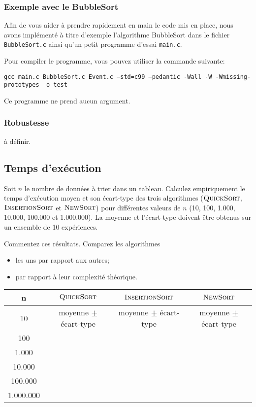 \documentclass[a4paper,10pt]{article}
\begin{document}
\subsubsection*{Exemple avec le BubbleSort}

Afin de vous aider à prendre rapidement en main le code mis en place, nous avons
implémenté à titre d'exemple l'algorithme BubbleSort dans le fichier
\texttt{BubbleSort.c} ainsi qu'un petit programme d'essai \texttt{main.c}.

Pour compiler le programme, vous pouvez utiliser la commande suivante:

{\small \texttt{gcc main.c BubbleSort.c Event.c --std=c99 --pedantic -Wall -W -Wmissing-prototypes -o test}}

Ce programme ne prend aucun argument.

\subsubsection*{Robustesse}

à définir.

\subsection{Temps d'exécution}

Soit $n$ le nombre de données à trier dans un tableau. Calculez empiriquement le
temps d'exécution moyen et son écart-type des trois algorithmes
($\textnormal{\scshape QuickSort}$, $\textnormal{\scshape InsertionSort}$ et $\textnormal{\scshape NewSort}$)  pour
différentes valeurs de $n$ (10, 100, 1.000, 10.000, 100.000 et 1.000.000). La
moyenne et l'écart-type doivent être obtenus sur un ensemble de 10 expériences.

Commentez ces résultats. Comparez les algorithmes
\begin{itemize}
\item les uns par rapport aux autres;
\item par rapport à leur complexité théorique.
\end{itemize}

\begin{center}
\begin{tabular}{cccc}
	\hline
	n & $\textnormal{\scshape QuickSort}$ & $\textnormal{\scshape InsertionSort}$ & $\textnormal{\scshape NewSort}$ \\
	\hline
	10 & moyenne $\pm$ écart-type & moyenne $\pm$ écart-type & moyenne $\pm$ écart-type\\
	100 & & &\\
	1.000 & & &\\
	10.000 & & &\\
	100.000 & & &\\
	1.000.000 & & &\\
\end{tabular}
\end{center}
\end{document}
